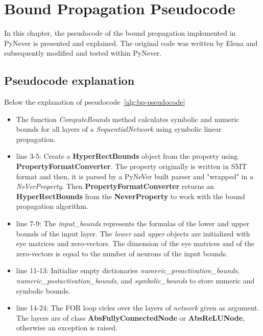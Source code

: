 \section{Bound Propagation Pseudocode}
In this chapter, the pseudocode of the bound propagation implemented in PyNever is presented and explained. The original code was written by Elena and subsequently modified and tested within PyNever.

\subsection{Pseudocode explanation}
Below the explanation of pseudocode~\ref{alg:bp-pseudocode}
\begin{itemize}
	\item The function \textit{ComputeBounds} method calculates symbolic and numeric bounds for all layers of a \textit{SequentialNetwork} using symbolic linear propagation.
	\item line 3-5:  Create a \textbf{HyperRectBounds} object from the property using \textbf{PropertyFormatConverter}. The property originally is written in SMT format and then, 
	it is parsed by a PyNeVer built parser and "wrapped" in a \textit{NeVerProperty}. 
	Then \textbf{PropertyFormatConverter} returns an \textbf{HyperRectBounds} from the \textbf{NeverProperty} to work with the bound propagation algorithm.
	\item line 7-9: The \textit{input\_bounds} represents the formulas of the lower and upper bounds of the input layer. The \textit{lower} and \textit{upper} objects are initialized with eye matrices and zero-vectors. The dimension of the eye matrices and of the zero-vectors is equal to the number of neurons of the input bounds.
	\item line 11-13: Initialize empty dictionaries \textit{numeric\_preactivation\_bounds}, \textit{numeric\_postactivation\_bounds}, and \textit{symbolic\_bounds} to store numeric and symbolic bounds.
	\item line 14-24: The FOR loop cicles over the layers of \textit{network} given as argument. 
	The layers are of class \textbf{AbsFullyConnectedNode} or \textbf{AbsReLUNode}, otherwise an exception is raised.

\end{itemize}
